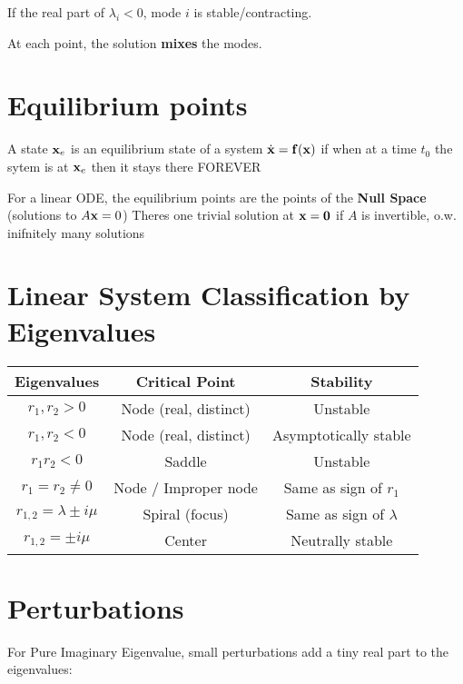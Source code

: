 If the real part of $\lambda_i < 0$, mode $i$ is stable/contracting.

At each point, the solution \textbf{mixes} the modes.

\section*{Equilibrium points}

A state $\mathbf{x}_e$ is an equilibrium state of a system $\dot{\mathbf{x}} = \mathbf{f}(\mathbf{x})$ if
when at a time $t_0$ the sytem is at $\mathbf{x}_e$ then it stays there FOREVER

For a linear ODE, the equilibrium points are the points of the \textbf{Null Space} (solutions to $A \mathbf{x} = 0$)
Theres one trivial solution at $\mathbf{x} = \mathbf{0}$ if $A$ is invertible, o.w. inifnitely many solutions


\section*{Linear System Classification by Eigenvalues}

\renewcommand{\arraystretch}{1.1} %
\begin{tabular}{|c|c|c|}
\hline
\textbf{Eigenvalues} & \textbf{Critical Point} & \textbf{Stability} \\
\hline
$r_1, r_2 > 0$ & Node (real, distinct) & Unstable \\
$r_1, r_2 < 0$ & Node (real, distinct) & Asymptotically stable \\
$r_1 r_2 < 0$ & Saddle & Unstable \\
$r_1 = r_2 \neq 0$ & Node / Improper node & Same as sign of $r_1$ \\
$r_{1,2} = \lambda \pm i\mu$ & Spiral (focus) & Same as sign of $\lambda$ \\
$r_{1,2} = \pm i\mu$ & Center & Neutrally stable \\
\hline
\end{tabular}

\section*{Perturbations}

For Pure Imaginary Eigenvalue,
small perturbations add a tiny real part to the eigenvalues:

